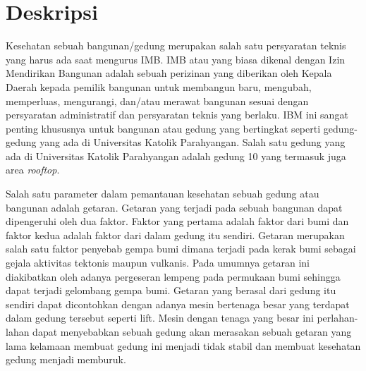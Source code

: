 \documentclass[a4paper,twoside]{article}
\begin{document}
\title{\@judultopik}
\author{\nama \textendash \@npm} 

\newcommand{\nama}{Andrianto Chandra}
\newcommand{\@npm}{2016730017}
\newcommand{\@judultopik}{Pengembangan aplikasi pemantauan getaran gedung menggunakan WSN}%
\newcommand{\jumpemb}{1} %
\newcommand{\tanggal}{06/02/2020}


\maketitle


\section{Deskripsi}
Kesehatan sebuah bangunan/gedung merupakan salah satu persyaratan teknis yang harus ada saat mengurus IMB. IMB atau yang biasa dikenal dengan Izin Mendirikan Bangunan adalah sebuah perizinan yang diberikan oleh Kepala Daerah kepada pemilik bangunan untuk membangun baru, mengubah, memperluas, mengurangi, dan/atau merawat bangunan sesuai dengan persyaratan administratif dan persyaratan teknis yang berlaku. IBM ini sangat penting khususnya untuk bangunan atau gedung yang bertingkat seperti gedung-gedung yang ada di Universitas Katolik Parahyangan. Salah satu gedung yang ada di Universitas Katolik Parahyangan adalah gedung 10 yang termasuk juga area \textit{rooftop}.


Salah satu parameter dalam pemantauan kesehatan sebuah gedung atau bangunan adalah getaran. Getaran yang terjadi pada sebuah bangunan dapat dipengeruhi oleh dua faktor. Faktor yang pertama adalah faktor dari bumi dan faktor kedua adalah faktor dari dalam gedung itu sendiri. Getaran merupakan salah satu faktor penyebab gempa bumi dimana terjadi pada kerak bumi sebagai gejala aktivitas tektonis maupun vulkanis. Pada umumnya getaran ini diakibatkan oleh adanya pergeseran lempeng pada permukaan bumi sehingga dapat terjadi gelombang gempa bumi. Getaran yang berasal dari gedung itu sendiri dapat dicontohkan dengan adanya mesin bertenaga besar yang terdapat dalam gedung tersebut seperti lift. Mesin dengan tenaga yang besar ini perlahan-lahan dapat menyebabkan sebuah gedung akan merasakan sebuah getaran yang lama kelamaan membuat gedung ini menjadi tidak stabil dan membuat kesehatan gedung menjadi memburuk. 
\end{document}
